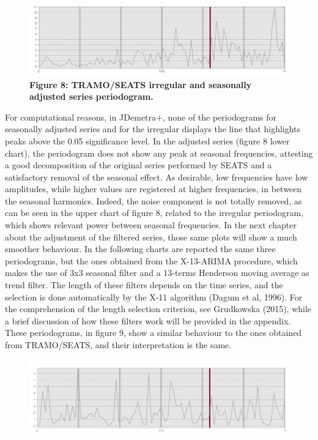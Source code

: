 \documentclass{article}
\begin{document}
\begin{figure}[H]
\centering
  \includegraphics[width=\linewidth]{../images/capitolo3/perSA.jpg}
  {\textbf{\scriptsize Figure 8: TRAMO/SEATS irregular and seasonally adjusted series periodogram.}}
\end{figure}
For computational reasons, in JDemetra+, none of the periodograms for seasonally adjusted series and for the irregular displays the line that highlights peaks above the 0.05 significance level. In the adjusted series (figure 8 lower chart), the periodogram does not show any peak at seasonal frequencies, attesting a good decomposition of the original series performed by SEATS and a satisfactory removal of the seasonal effect. As desirable, low frequencies have low amplitudes, while higher values are registered at higher frequencies, in between the seasonal harmonics. Indeed, the noise component is not totally removed, as can be seen in the upper chart of figure 8, related to the irregular periodogram, which shows relevant power between seasonal frequencies. In the next chapter about the adjustment of the filtered series, those same plots will show a much smoother behaviour. In the following charts are reported the same three periodograms, but the ones obtained from the X-13-ARIMA procedure, which makes the use of 3x3 seasonal filter and a 13-terms Henderson moving average as trend filter. The length of these filters depends on the time series, and the selection is done automatically by the X-11 algorithm (Dagum et al, 1996). For the comprehension of the length selection criterion, see Grudkowska (2015), while a brief discussion of how these filters work will be provided in the appendix. These periodograms, in figure 9, show a similar behaviour to the ones obtained from TRAMO/SEATS, and their interpretation is the same. 
\begin{figure}[H]
  \includegraphics[width=\linewidth]{../images/capitolo3/XperRES.jpg} 
  \label{fig:1}
\end{figure}
\end{document}
